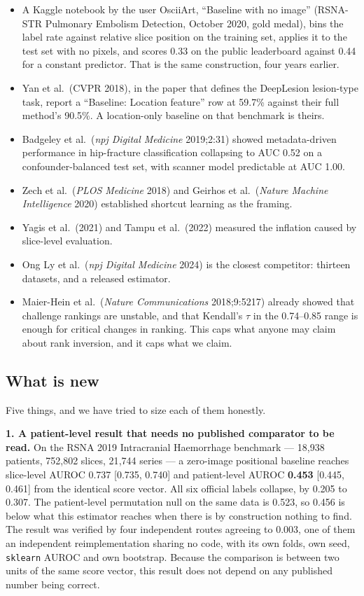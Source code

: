 \documentclass[11pt,a4paper]{article}
\begin{document}
\begin{itemize}
\item A Kaggle notebook by the user OsciiArt, ``Baseline with no image'' (RSNA-STR
Pulmonary Embolism Detection, October 2020, gold medal), bins the label rate against
relative slice position on the training set, applies it to the test set with no
pixels, and scores 0.33 on the public leaderboard against 0.44 for a constant
predictor. That is the same construction, four years earlier.
\item Yan et al.\ (CVPR 2018), in the paper that defines the DeepLesion lesion-type
task, report a ``Baseline: Location feature'' row at 59.7\% against their full
method's 90.5\%. A location-only baseline on that benchmark is theirs.
\item Badgeley et al.\ (\emph{npj Digital Medicine} 2019;2:31) showed metadata-driven
performance in hip-fracture classification collapsing to AUC 0.52 on a
confounder-balanced test set, with scanner model predictable at AUC 1.00.
\item Zech et al.\ (\emph{PLOS Medicine} 2018) and Geirhos et al.\ (\emph{Nature
Machine Intelligence} 2020) established shortcut learning as the framing.
\item Yagis et al.\ (2021) and Tampu et al.\ (2022) measured the inflation caused by
slice-level evaluation.
\item Ong Ly et al.\ (\emph{npj Digital Medicine} 2024) is the closest competitor:
thirteen datasets, and a released estimator.
\item Maier-Hein et al.\ (\emph{Nature Communications} 2018;9:5217) already showed
that challenge rankings are unstable, and that Kendall's $\tau$ in the 0.74--0.85
range is enough for critical changes in ranking. This caps what anyone may claim
about rank inversion, and it caps what we claim.
\end{itemize}

\subsection*{What is new}

Five things, and we have tried to size each of them honestly.

\textbf{1. A patient-level result that needs no published comparator to be read.} On
the RSNA 2019 Intracranial Haemorrhage benchmark --- 18{,}938 patients, 752{,}802
slices, 21{,}744 series --- a zero-image positional baseline reaches slice-level AUROC
0.737 [0.735, 0.740] and patient-level AUROC \textbf{0.453} [0.445, 0.461] from the
identical score vector. All six official labels collapse, by 0.205 to 0.307. The
patient-level permutation null on the same data is 0.523, so 0.456 is below what this
estimator reaches when there is by construction nothing to find. The result was
verified by four independent routes agreeing to 0.003, one of them an independent
reimplementation sharing no code, with its own folds, own seed, \texttt{sklearn}
AUROC and own bootstrap. Because the comparison is between two units of the same score
vector, this result does not depend on any published number being correct.
\end{document}
